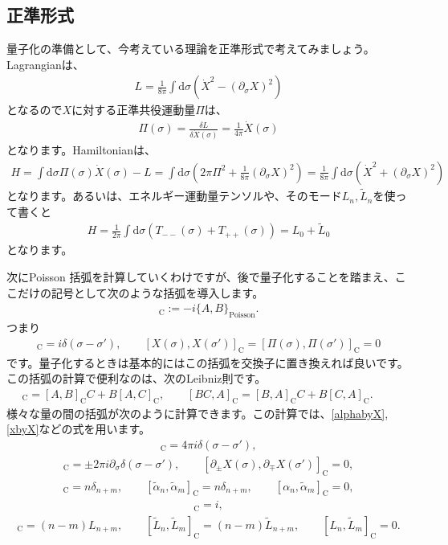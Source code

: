 \documentclass[report,paper=a4, fontsize=12pt, line_length=16cm, number_of_lines=34,dvipdfmx]{jlreq}
\numberwithin{equation}{chapter}
\numberwithin{equation}{section}
\newcommand{\del}{\partial}
\newcommand{\alphat}{\tilde{\alpha}}
\newcommand{\Lt}{\widetilde{L}}
\newcommand{\cbk}[1]{[#1]_{\mathrm{C}}}
\newcommand{\di}{\mathrm{d}}
\begin{document}
\subsection{正準形式}
量子化の準備として、今考えている理論を正準形式で考えてみましょう。
Lagrangianは、
\begin{align}
L=\frac{1}{8\pi}\int \di \sigma \left(\dot{X}^2-(\del_{\sigma}X)^2\right)
\end{align}
となるので$X$に対する正準共役運動量$\Pi$は、
\begin{align}
\Pi(\sigma)=\frac{\delta L}{\delta \dot{X}(\sigma)}=\frac{1}{4\pi} \dot{X}(\sigma)
\end{align}
となります。Hamiltonianは、
\begin{align}
H=\int \di \sigma \Pi(\sigma) \dot {X} (\sigma)-L
=\int \di \sigma (2\pi \Pi^2+\frac{1}{8\pi} (\del_{\sigma}X)^2)
=\frac{1}{8\pi}\int \di \sigma (\dot{X}^2+(\del_{\sigma}X)^2)
\end{align}
となります。あるいは、エネルギー運動量テンソルや、そのモード$L_n,\Lt_n$を使って書くと
\begin{align}
H=\frac{1}{2\pi}\int \di \sigma (T_{--}(\sigma)+T_{++}(\sigma))=L_0+\Lt_0\label{CFT-Hamiltonian}
\end{align}
となります。

次にPoisson 括弧を計算していくわけですが、後で量子化することを踏まえ、ここだけの記号として次のような括弧を導入します。
\begin{align}
\cbk{A,B}:=-i\{A,B\}_{\mathrm{Poisson}}.
\end{align}
つまり
\begin{align}
\cbk{X(\sigma),\Pi(\sigma')}=i\delta(\sigma-\sigma'),\qquad
\cbk{X(\sigma),X(\sigma')}=
\cbk{\Pi(\sigma),\Pi(\sigma')}=0
\end{align}
です。量子化するときは基本的にはこの括弧を交換子に置き換えれば良いです。
この括弧の計算で便利なのは、次のLeibniz則です。
\begin{align}
\cbk{A,BC}=\cbk{A,B}C+B\cbk{A,C},\qquad
\cbk{BC,A}=\cbk{B,A}C+B\cbk{C,A}.\qquad
\end{align}
様々な量の間の括弧が次のように計算できます。この計算では、\eqref{alphabyX},\eqref{xbyX}などの式を用います。
\begin{align}
\cbk{X(\sigma),\dot{X}(\sigma')}=
4\pi i \delta(\sigma-\sigma'),
\end{align}
\begin{align}
\cbk{\del_{\pm}X(\sigma),\del_{\pm}X(\sigma')}
=\pm 2\pi i \del_{\sigma}\delta(\sigma-\sigma'),\qquad
\cbk{\del_{\pm}X(\sigma),\del_{\mp}X(\sigma')}=0,
\end{align}
\begin{align}
\cbk{\alpha_{n},\alpha_{m}}=n\delta_{n+m},\qquad
\cbk{\alphat_{n},\alphat_{m}}=n\delta_{n+m},\qquad
\cbk{\alpha_{n},\alphat_{m}}=0,
\end{align}
\begin{align}
  \cbk{x,p}=i,
\end{align}
\begin{align}
\cbk{L_n,L_m}=(n-m)L_{n+m},\qquad
\cbk{\Lt_n,\Lt_m}=(n-m)\Lt_{n+m},\qquad
\cbk{L_n,\Lt_m}=0.
\end{align}
\end{document}
